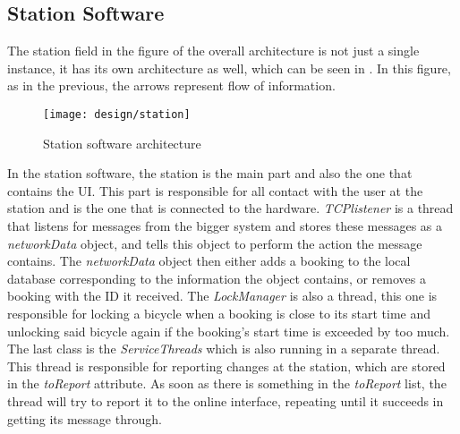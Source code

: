 \subsection{Station Software}
The station field in the figure of the overall architecture is not just a single instance, it has its own architecture as well, which can be seen in . In this figure, as in the previous, the arrows represent flow of information.

\begin{figure}[h]
	\centering
	\texttt{[image: design/station]}
	\caption{Station software architecture}\label{fig:stationarch}
\end{figure}

In the station software, the station is the main part and also the one that contains the UI. 
This part is responsible for all contact with the user at the station and is the one that is connected to the hardware.
\textit{TCPlistener} is a thread that listens for messages from the bigger system and stores these messages as a \textit{networkData} object, and tells this object to perform the action the message contains.
The \textit{networkData} object then either adds a booking to the local database corresponding to the information the object contains, or removes a booking with the ID it received.
The \textit{LockManager} is also a thread, this one is responsible for locking a bicycle when a booking is close to its start time and unlocking said bicycle again if the booking's start time is exceeded by too much.
The last class is the \textit{ServiceThreads} which is also running in a separate thread.
This thread is responsible for reporting changes at the station, which are stored in the \textit{toReport} attribute.
As soon as there is something in the \textit{toReport} list, the thread will try to report it to the online interface, repeating until it succeeds in getting its message through.